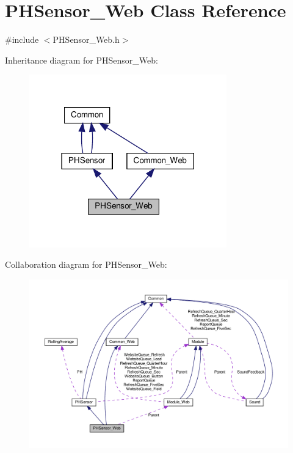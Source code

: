 \hypertarget{class_p_h_sensor___web}{}\section{P\+H\+Sensor\+\_\+\+Web Class Reference}
\label{class_p_h_sensor___web}


{\ttfamily \#include $<$P\+H\+Sensor\+\_\+\+Web.\+h$>$}



Inheritance diagram for P\+H\+Sensor\+\_\+\+Web\+:
\nopagebreak
\begin{figure}[H]
\begin{center}
\leavevmode
\includegraphics[width=242pt]{class_p_h_sensor___web__inherit__graph}
\end{center}
\end{figure}


Collaboration diagram for P\+H\+Sensor\+\_\+\+Web\+:
\nopagebreak
\begin{figure}[H]
\begin{center}
\leavevmode
\includegraphics[width=350pt]{class_p_h_sensor___web__coll__graph}
\end{center}
\end{figure}
